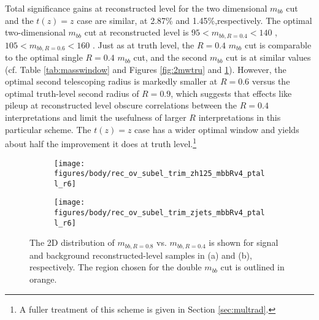Total significance gains at reconstructed level for the two dimensional $m_{bb}$ cut and the $t\left(z\right)=z$ case are similar, at 2.87\% and 1.45\%,respectively.  The optimal two-dimensional $m_{bb}$ cut at reconstructed level is $95<m_{bb,R=0.4}<140$ \GeV, $105<m_{bb,R=0.6}<160$ \GeV.  Just as at truth level, the $R=0.4$ $m_{bb}$ cut is comparable to the optimal single $R=0.4$ $m_{bb}$ cut, and the second $m_{bb}$ cut is at similar values (cf. Table \ref{tab:masswindow} and Figures \ref{fig:2mwtru} and \ref{fig:2mwrec}).  However, the optimal second telescoping radius is markedly smaller at $R=0.6$ versus the optimal truth-level second radius of $R=0.9$, which suggests that effects like pileup at reconstructed level obscure correlations between the $R=0.4$ interpretations and limit the usefulness of larger $R$ interpretations in this particular scheme. The $t\left(z\right)=z$ case has a wider optimal window and yields about half the improvement it does at truth level.\footnote{A fuller treatment of this scheme is given in Section \ref{sec:multrad}.}

\begin{figure}[!htbp]\captionsetup{justification=centering}
\begin{center}
\begin{subfigure}[t]{18pc}\centering\texttt{[image: figures/body/rec\_ov\_subel\_trim\_zh125\_mbbRv4\_ptall\_r6]}\caption{}\end{subfigure}
\begin{subfigure}[t]{18pc}\centering\texttt{[image: figures/body/rec\_ov\_subel\_trim\_zjets\_mbbRv4\_ptall\_r6]}\caption{}\end{subfigure}
\caption{\label{fig:2mwrec}The 2D distribution of $m_{bb,R=0.8}$ vs. $m_{bb,R=0.4}$ is shown for signal and background reconstructed-level samples in (a) and (b), respectively.  The region chosen for the double $m_{bb}$ cut is outlined in orange.}
\end{center}
\end{figure}

